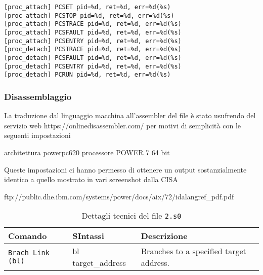 \documentclass[10pt,a4paper, titlepage]{report}
\begin{document}
\begin{lstlisting}
[proc_attach] PCSET pid=%d, ret=%d, err=%d(%s)
[proc_attach] PCSTOP pid=%d, ret=%d, err=%d(%s)
[proc_attach] PCSTRACE pid=%d, ret=%d, err=%d(%s)
[proc_attach] PCSFAULT pid=%d, ret=%d, err=%d(%s)
[proc_attach] PCSENTRY pid=%d, ret=%d, err=%d(%s)
[proc_detach] PCSTRACE pid=%d, ret=%d, err=%d(%s)
[proc_detach] PCSFAULT pid=%d, ret=%d, err=%d(%s)
[proc_detach] PCSENTRY pid=%d, ret=%d, err=%d(%s)
[proc_detach] PCRUN pid=%d, ret=%d, err=%d(%s)
\end{lstlisting}





\subsubsection{Disassemblaggio}

La traduzione dal linguaggio macchina all'assembler del file è stato usufrendo del servizio web https://onlinedisassembler.com/ per motivi di semplicità con le seguenti impostazioni

architettura powerpc620
processore POWER 7
64 bit

Queste impostazioni ci hanno permesso di ottenere un output sostanzialmente identico a quello mostrato in vari screenshot dalla CISA




ftp://public.dhe.ibm.com/systems/power/docs/aix/72/idalangref\_pdf.pdf

\begin{table}[h!]
  \begin{center}
    \caption{Dettagli tecnici del file \texttt{2.s0}}
    \centering
    \label{tab:table55}
    
    \begin{tabular}{l|l|l}
      \toprule
        Comando & SIntassi & Descrizione \\
    \midrule
        \texttt{Brach Link (bl)} & bl target\_address & Branches to a specified target address. \\
      
      
      
    
 	
      \bottomrule
    \end{tabular}
   
  \end{center}
\end{table}
\end{document}
